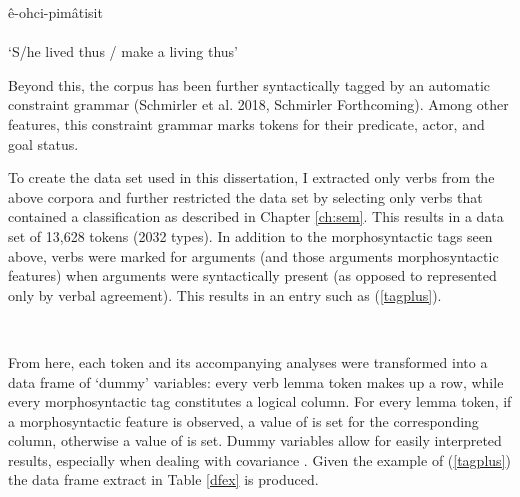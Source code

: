 \begin{exe}
\ex
\gll ê-ohci-pimâtisit \\
 \\
\trans `S/he lived thus / make a living thus'
\label{tag}
\end{exe}

Beyond this, the corpus has been further syntactically tagged by an automatic constraint grammar (Schmirler et al. 2018, Schmirler Forthcoming). Among other features, this constraint grammar marks tokens for their predicate, actor, and goal status. 

To create the data set used in this dissertation, I extracted only verbs from the above corpora and further restricted the data set by selecting only verbs that contained a classification as described in Chapter \ref{ch:sem}. This results in a data set of 13,628 tokens (2032 types). In addition to the morphosyntactic tags seen above, verbs were marked for arguments (and those arguments morphosyntactic features) when arguments were syntactically present (as opposed to represented only by verbal agreement). This results in an entry such as (\ref{tagplus}). 

\begin{exe}
\ex
{} \\
\label{tagplus}
\end{exe}

From here, each token and its accompanying analyses were transformed into a data frame of `dummy' variables: every verb lemma token makes up a row, while every morphosyntactic tag constitutes a logical column. For every lemma token, if a morphosyntactic feature is observed, a value of  is set for the corresponding column, otherwise a value of  is set. Dummy variables allow for easily interpreted results, especially when dealing with covariance \citep{baayen2012mixed}. Given the example of (\ref{tagplus}) the data frame extract in Table \ref{dfex} is produced.



\begin{table}
\centering
{}
\caption{Extract from Data Frame \label{dfex}
}
\end{table}

